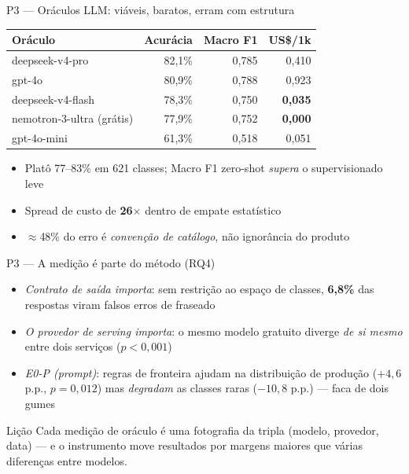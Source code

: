 \documentclass[aspectratio=169,11pt]{beamer}
\begin{document}
\begin{frame}{P3 --- Oráculos LLM: viáveis, baratos, erram com estrutura}
\centering\small
\begin{tabular}{lrrr}
\toprule
\textbf{Oráculo} & \textbf{Acurácia} & \textbf{Macro F1} & \textbf{US\$/1k} \\
\midrule
deepseek-v4-pro & 82,1\% & 0,785 & 0,410 \\
gpt-4o & 80,9\% & 0,788 & 0,923 \\
deepseek-v4-flash & 78,3\% & 0,750 & \textbf{0,035} \\
nemotron-3-ultra (grátis) & 77,9\% & 0,752 & \textbf{0,000} \\
gpt-4o-mini & 61,3\% & 0,518 & 0,051 \\
\bottomrule
\end{tabular}
\vspace{0.6em}
\begin{itemize}\footnotesize
  \item Platô 77--83\% em 621 classes; Macro F1 zero-shot \emph{supera} o supervisionado leve
  \item Spread de custo de \textbf{26$\times$} dentro de empate estatístico
  \item $\approx$48\% do erro é \emph{convenção de catálogo}, não ignorância do produto
\end{itemize}
\end{frame}


\begin{frame}{P3 --- A medição é parte do método (RQ4)}
\begin{itemize}
  \item \emph{Contrato de saída importa}: sem restrição ao espaço de
        classes, \textbf{6,8\%} das respostas viram falsos erros de fraseado
  \item \emph{O provedor de \textit{serving} importa}: o mesmo modelo
        gratuito diverge \emph{de si mesmo} entre dois serviços ($p<0{,}001$)
  \item \emph{E0-P (prompt)}: regras de fronteira ajudam na distribuição de
        produção ($+4{,}6$ p.p., $p=0{,}012$) mas \emph{degradam} as classes
        raras ($-10{,}8$ p.p.) --- faca de dois gumes
\end{itemize}
\vspace{0.3em}
\begin{block}{Lição}
\footnotesize Cada medição de oráculo é uma fotografia da tripla
(modelo, provedor, data) --- e o instrumento move resultados por margens
maiores que várias diferenças entre modelos.
\end{block}
\end{frame}
\end{document}
